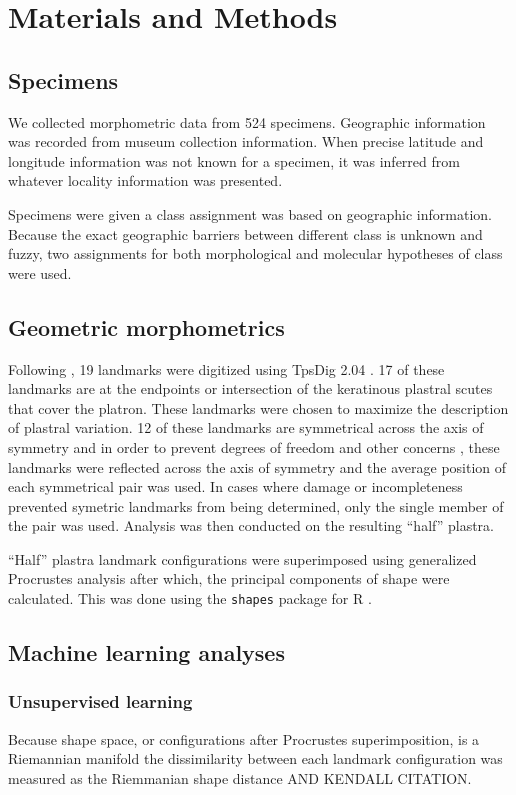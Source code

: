 \documentclass[12pt]{article}\usepackage{graphicx, color}
\begin{document}
\section{Materials and Methods}
\subsection{Specimens}
We collected morphometric data from 524 specimens. Geographic information was recorded from museum collection information. When precise latitude and longitude information was not known for a specimen, it was inferred from whatever locality information was presented. %

Specimens were given a class assignment was based on geographic information. Because the exact geographic barriers between different class is unknown and fuzzy, two assignments for both morphological and molecular hypotheses of class were used. 

\subsection{Geometric morphometrics}
Following \citet{Angielczyk2011}, 19 landmarks were digitized using TpsDig 2.04 \citep{Rohlf2005}. 17 of these landmarks are at the endpoints or intersection of the keratinous plastral scutes that cover the platron. These landmarks were chosen to maximize the description of plastral variation. 12 of these landmarks are symmetrical across the axis of symmetry and in order to prevent degrees of freedom and other concerns \citep{Klingenberg2007}, these landmarks were reflected across the axis of symmetry and the average position of each symmetrical pair was used. In cases where damage or incompleteness prevented symetric landmarks from being determined, only the single member of the pair was used. Analysis was then conducted on the resulting ``half'' plastra.

``Half'' plastra landmark configurations were superimposed using generalized Procrustes analysis \citep{Dryden1998a} after which, the principal components of shape were calculated. This was done using the \texttt{shapes} package for R \citep{2013, Dryden2013}.


\subsection{Machine learning analyses}
\subsubsection{Unsupervised learning}
Because shape space, or configurations after Procrustes superimposition, is a Riemannian manifold \citep{Dryden1998a} the dissimilarity between each landmark configuration was measured as the Riemmanian shape distance \citep{Dryden1998a} AND KENDALL CITATION.
\end{document}
